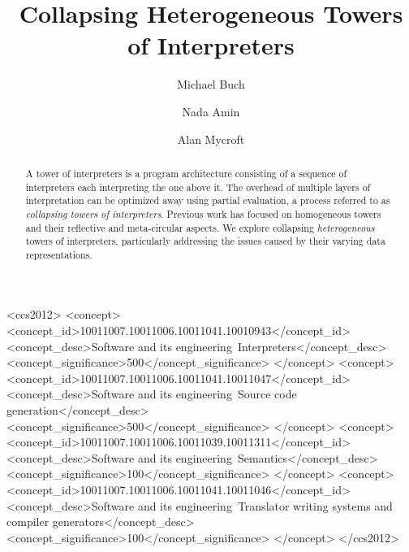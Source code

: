 \documentclass[sigplan,anonymous,review]{acmart}
\theoremstyle{definition}
\begin{document}
\title{Collapsing Heterogeneous Towers of Interpreters}

\author{Michael Buch}

\author{Nada Amin}

\author{Alan Mycroft}

\renewcommand{\shortauthors}{Buch, Amin and Mycroft}

\begin{abstract}
A tower of interpreters is a program architecture consisting of a sequence of interpreters each interpreting the one above it. The overhead of multiple layers of interpretation can be optimized away using partial evaluation, a process referred to as \textit{collapsing towers of interpreters}.
Previous work has focused on homogeneous towers and their reflective and meta-circular aspects. We explore collapsing \textit{heterogeneous} towers of interpreters, particularly addressing the issues caused by their varying data representations.
\end{abstract}

\begin{CCSXML}
<ccs2012>
<concept>
<concept_id>10011007.10011006.10011041.10010943</concept_id>
<concept_desc>Software and its engineering~Interpreters</concept_desc>
<concept_significance>500</concept_significance>
</concept>
<concept>
<concept_id>10011007.10011006.10011041.10011047</concept_id>
<concept_desc>Software and its engineering~Source code generation</concept_desc>
<concept_significance>500</concept_significance>
</concept>
<concept>
<concept_id>10011007.10011006.10011039.10011311</concept_id>
<concept_desc>Software and its engineering~Semantics</concept_desc>
<concept_significance>100</concept_significance>
</concept>
<concept>
<concept_id>10011007.10011006.10011041.10011046</concept_id>
<concept_desc>Software and its engineering~Translator writing systems and compiler generators</concept_desc>
<concept_significance>100</concept_significance>
</concept>
</ccs2012>
\end{CCSXML}
\end{document}
